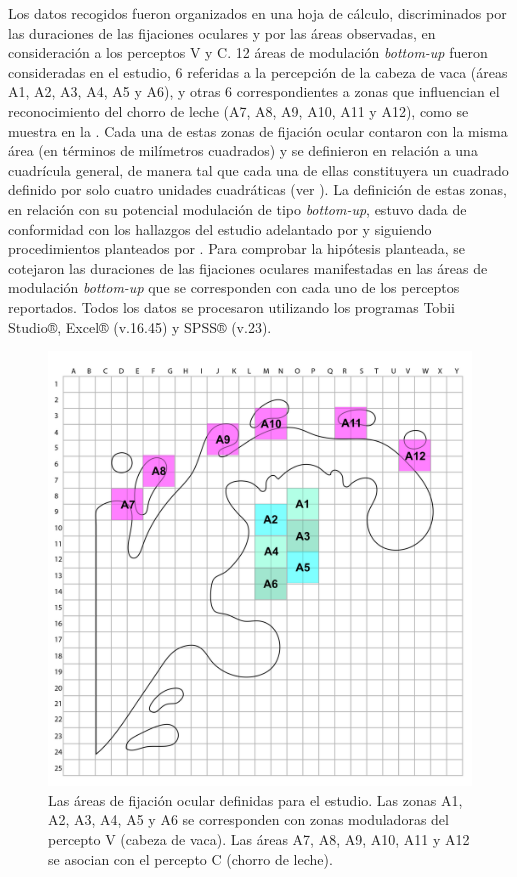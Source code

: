 \documentclass[spanish]{textolivre}
\begin{document}
Los datos recogidos fueron organizados en una hoja de cálculo, discriminados por las duraciones de las fijaciones oculares y por las áreas observadas, en consideración a los perceptos V y C. 12 áreas de modulación \textit{bottom-up} fueron consideradas en el estudio, 6 referidas a la percepción de la cabeza de vaca (áreas A1, A2, A3, A4, A5 y A6), y otras 6 correspondientes a zonas que influencian el reconocimiento del chorro de leche (A7, A8, A9, A10, A11 y A12), como se muestra en la . Cada una de estas zonas de fijación ocular contaron con la misma área (en términos de milímetros cuadrados) y se definieron en relación a una cuadrícula general, de manera tal que cada una de ellas constituyera un cuadrado definido por solo cuatro unidades cuadráticas (ver ). La definición de estas zonas, en relación con su potencial modulación de tipo \textit{bottom-up}, estuvo dada de conformidad con los hallazgos del estudio adelantado por \textcite{bernal_robayo_alisis_2020} y siguiendo procedimientos planteados por \textcite{rodriguez-martinez_can_2024}. Para comprobar la hipótesis planteada, se cotejaron las duraciones de las fijaciones oculares manifestadas en las áreas de modulación \textit{bottom-up} que se corresponden con cada uno de los perceptos reportados. Todos los datos se procesaron utilizando los programas Tobii Studio®, Excel® (v.16.45) y SPSS® (v.23).

\begin{figure}
\centering
\begin{minipage}{.75\textwidth}
    \includegraphics[width=\linewidth]{Fig5.jpeg}
    \caption{Las áreas de fijación ocular definidas para el estudio. Las zonas A1, A2, A3, A4, A5 y A6 se corresponden con zonas moduladoras del percepto V (cabeza de vaca). Las áreas A7, A8, A9, A10, A11 y A12 se asocian con el percepto C (chorro de leche).}
    \label{fig5}
\end{minipage}
\end{figure}
\end{document}
